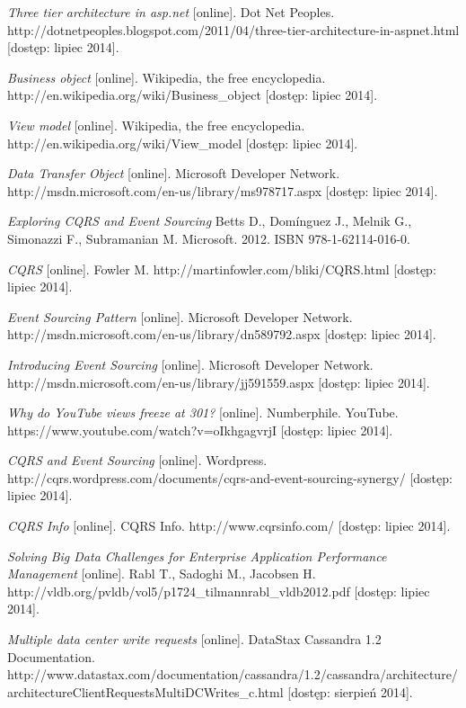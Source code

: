 \begin{thebibliography}{}
  \emph{Three tier architecture in asp.net} [online].
  Dot Net Peoples.
  http://dotnetpeoples.blogspot.com/2011/04/three-tier-architecture-in-aspnet.html [dostęp: lipiec 2014].

  \emph{Business object} [online].
  Wikipedia, the free encyclopedia.
  http://en.wikipedia.org/wiki/Business\_object [dostęp: lipiec 2014].
  
  \emph{View model} [online].
  Wikipedia, the free encyclopedia.
  http://en.wikipedia.org/wiki/View\_model [dostęp: lipiec 2014].
 
  \emph{Data Transfer Object} [online].
  Microsoft Developer Network.
  http://msdn.microsoft.com/en-us/library/ms978717.aspx [dostęp: lipiec 2014].
 
  \emph{Exploring CQRS and Event Sourcing}
  Betts D., Domínguez J., Melnik G., Simonazzi F., Subramanian M.
  Microsoft.
  2012.
  ISBN 978-1-62114-016-0.
 
  \emph{CQRS} [online].
  Fowler M.
  http://martinfowler.com/bliki/CQRS.html [dostęp: lipiec 2014].
 
  \emph{Event Sourcing Pattern} [online].
  Microsoft Developer Network.
  http://msdn.microsoft.com/en-us/library/dn589792.aspx [dostęp: lipiec 2014].
 
  \emph{Introducing Event Sourcing} [online].
  Microsoft Developer Network.
  http://msdn.microsoft.com/en-us/library/jj591559.aspx [dostęp: lipiec 2014].
 
  \emph{Why do YouTube views freeze at 301?} [online].
  Numberphile.
  YouTube.
  https://www.youtube.com/watch?v=oIkhgagvrjI [dostęp: lipiec 2014].
 
  \emph{CQRS and Event Sourcing} [online].
  Wordpress.
  http://cqrs.wordpress.com/documents/cqrs-and-event-sourcing-synergy/ [dostęp: lipiec 2014].
  
  \emph{CQRS Info} [online].
  CQRS Info.
  http://www.cqrsinfo.com/ [dostęp: lipiec 2014].
 
  \emph{Solving Big Data Challenges for Enterprise Application Performance Management} [online].
  Rabl T., Sadoghi M., Jacobsen H.
  http://vldb.org/pvldb/vol5/p1724\_tilmannrabl\_vldb2012.pdf [dostęp: lipiec 2014].
 
  \emph{Multiple data center write requests} [online].
  DataStax Cassandra 1.2 Documentation.
  http://www.datastax.com/documentation/cassandra/1.2/cassandra/architecture/architectureClientRequestsMultiDCWrites\_c.html [dostęp: sierpień 2014].
 

\end{thebibliography}
